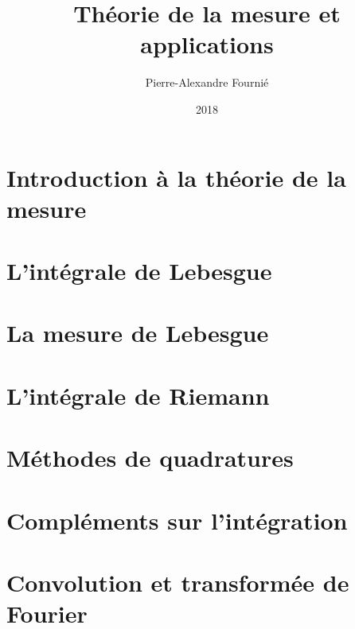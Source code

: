 \documentclass[a4paper,11pt]{book}
\title{Théorie de la mesure et applications}
\author{Pierre-Alexandre Fournié}
\date{2018}
\begin{document}
 
\frontmatter
 
\maketitle


\thispagestyle{empty} 


\mainmatter

\cleardoublepage
\chapter{Introduction à la théorie de la mesure}
\thispagestyle{empty}



\cleardoublepage
\chapter{L'intégrale de Lebesgue}
\thispagestyle{empty}


\cleardoublepage
\chapter{La mesure de Lebesgue}
\thispagestyle{empty}


\cleardoublepage
\chapter{L'intégrale de Riemann}
\thispagestyle{empty}


\cleardoublepage
\chapter{Méthodes de quadratures}
\thispagestyle{empty}


\cleardoublepage
\chapter{Compléments sur l'intégration}
\thispagestyle{empty}


\cleardoublepage
\chapter{Convolution et transformée de Fourier}
\thispagestyle{empty}

\end{document}
